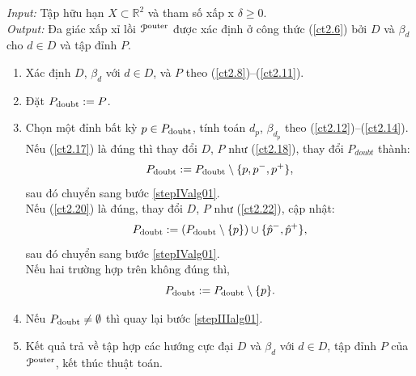 \documentclass[12pt,a4paper,openany,oneside]{report}
\def\R{\mathbb{R}}
\begin{document}
\begin{algorithm}\label{alg01}  \rm 
		\caption{}  \label{al-blduoi0}
	\emph{Input:} Tập hữu hạn $X \subset \R^2$ và tham số xấp x $\delta \geq 0$. \\
	\emph{Output:} Đa giác xấp xỉ lồi ${\cal P}^{\rm outer}$ được xác định ở công thức (\ref{ct2.6}) bởi $D$ và $\beta_d$ cho $d \in D$ và tập đỉnh $P$.
	\begin{enumerate}
		\item\label{stepIalg01} 
		Xác định $D$, $\beta_d$ với $d \in D$, và $P$ theo (\ref{ct2.8})--(\ref{ct2.11}).
		
		\item\label{stepIIalg01} Đặt $P_{\rm doubt} := P$.
		
		\item\label{stepIIIalg01} 
		 Chọn một đỉnh bất kỳ $p \in P_{\rm doubt}$, tính toán $d_p$, $\beta_{d_p}$ theo (\ref{ct2.12})--(\ref{ct2.14}). \\
		Nếu (\ref{ct2.17}) là đúng thì thay đổi $D$, $P$ như (\ref{ct2.18}), thay đổi $P_{doubt}$ thành:
		\begin{equation}\label{ct2.23}
			P_{\rm doubt} := P_{\rm doubt} \setminus \{p, p^-, p^+\},
		\end{equation}
		sau đó chuyển sang bước \ref{stepIValg01}.\\
		Nếu %
		(\ref{ct2.20}) là đúng, thay đổi $D$, $P$ như (\ref{ct2.22}), cập nhật:
		\begin{equation}\label{ct2.24}
			P_{\rm doubt} := (P_{\rm doubt} \setminus \{p\}) \cup \{\hat p^-, \hat p^+\},
		\end{equation}
		sau đó chuyển sang bước \ref{stepIValg01}.\\
		Nếu hai trường hợp trên không đúng thì, 
		\begin{equation}\label{ct2.25}
			P_{\rm doubt} := P_{\rm doubt} \setminus \{p\}.
		\end{equation}
		
		\item\label{stepIValg01} 
		Nếu $P_{\rm doubt} \ne \emptyset$  thì quay lại bước \ref{stepIIIalg01}.
		
		\item
		 Kết quả trả về tập hợp các hướng cực đại $D$ và $\beta_d$ với $d \in D$, tập đỉnh $P$ của ${\cal P}^{\rm outer}$, kết thúc thuật toán.
	\end{enumerate}
\end{algorithm}
\end{document}
